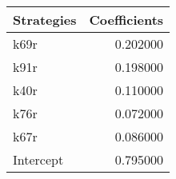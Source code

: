 \begin{tabular}{lr}
\toprule
Strategies & Coefficients \\
\midrule
k69r & 0.202000 \\
k91r & 0.198000 \\
k40r & 0.110000 \\
k76r & 0.072000 \\
k67r & 0.086000 \\
Intercept & 0.795000 \\
\bottomrule
\end{tabular}
